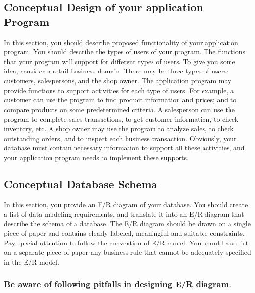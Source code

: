 \documentclass[11pt]{article}
\begin{document}
\subsection*{Conceptual Design of your application Program}
\label{sec-4-3}


   In this section, you should describe proposed functionality of your
   application program. You should describe the types of users of your
   program. The functions that your program will support for different
   types of users. To give you some idea, consider a retail business
   domain. There may be three types of users: customers, salespersons,
   and the shop owner. The application program may provide functions to
   support activities for each type of users. For example, a customer can
   use the program to find product information and prices; and to compare
   products on some predetermined criteria. A salesperson can use the
   program to complete sales transactions, to get customer information,
   to check inventory, etc. A shop owner may use the program to analyze
   sales, to check outstanding orders, and to inspect each business
   transaction. Obviously, your database must contain necessary
   information to support all these activities, and your application
   program needs to implement these supports.
\subsection*{Conceptual Database Schema}
\label{sec-4-4}


   In this section, you provide an E/R diagram of your database. You
   should create a list of data modeling requirements, and translate it
   into an E/R diagram that describe the schema of a database. The E/R
   diagram should be drawn on a single piece of paper and contains
   clearly labeled, meaningful and suitable constraints. Pay special
   attention to follow the convention of E/R model. You should also list
   on a separate piece of paper any business rule that cannot be
   adequately specified in the E/R model.
\subsubsection*{Be aware of following pitfalls in designing E/R diagram.}
\label{sec-4-4-1}
\end{document}
